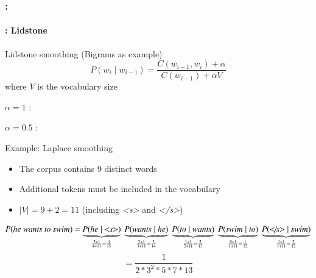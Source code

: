 \documentclass[xcolor=table]{beamer}
\begin{document}
\begin{frame}
	\frametitle{\insertshortsubtitle: \insertsection}
	\framesubtitle{\insertsubsection: Lidstone}
	
	\vspace{-6pt}
	\begin{block}{Lidstone smoothing (Bigrams as example)}
		\[
		P(w_i \mid w_{i-1}) = \frac{C(w_{i-1}, w_i) + \alpha}{C(w_{i-1}) + \alpha V}
		\]
		where $V$ is the vocabulary size
		
		$\alpha = 1$ :  
		
		$\alpha = 0.5$ : 
	\end{block}
	
	\vspace{-6pt}
	\begin{exampleblock}{Example: Laplace smoothing}
		\begin{itemize}
			\item The corpus contains 9 distinct words
			\item Additional tokens must be included in the vocabulary
			\item $|V| = 9 + 2 = 11$ (including \textit{\textless s\textgreater} and \textit{\textless/s\textgreater})
		\end{itemize}
		\[
		P(\text{\textit{he wants to swim}}) = 
		\underbrace{P(\textit{he} \mid \textit{\textless s\textgreater})}_{\frac{3 + 1}{4 + 11} = \frac{4}{15}}\ 
		\underbrace{P(\textit{wants} \mid \textit{he})}_{\frac{2 + 1}{3 + 11} = \frac{3}{14}}\ 
		\underbrace{P(\textit{to} \mid \textit{wants})}_{\frac{1 + 1}{2 + 11} = \frac{2}{13}}\ 
		\underbrace{P(\textit{swim} \mid \textit{to})}_{\frac{0 + 1}{1 + 11} = \frac{1}{12}}\ 
		\underbrace{P(\textit{\textless/s\textgreater} \mid \textit{swim})}_{\frac{1 + 1}{1 + 11} = \frac{2}{12}} 
		\]
		\[= \frac{1}{2 * 3^2 * 5 * 7 * 13}\]
	\end{exampleblock}
	
\end{frame}
\end{document}
